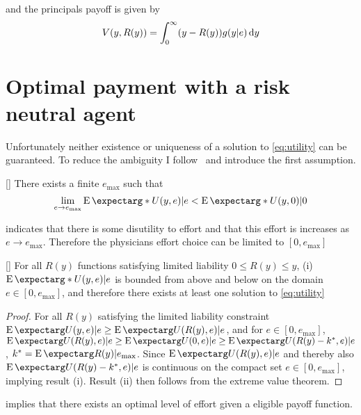 and the principals payoff is given by 
\begin{align}
    V(y,R(y))=\int_0^\infty (y-R(y))g(y|e)\dif y
\end{align}
\section{Optimal payment with a risk neutral agent} %
\label{sec:optimal_payment_with_a_risk_neutral_agent}


Unfortunately neither existence or uniqueness of a solution to \cref{eq:utility} can be guaranteed. To reduce the ambiguity I follow~\textcite{Innes1990Limited} and introduce the first assumption.

\begin{assumption}{[\textcite{Innes1990Limited}]}
\label{asump:effort}
 There exists a finite $e_{\max}$ such that 
\[
    \lim_{e \rightarrow e_{\max}} \cEX*{U(y,e)|e}<\cEX*{U(y,0)|0}
\]
 \end{assumption}

  indicates that there is some disutility to effort and that this effort is increases as $e\rightarrow e_{\max}$. Therefore the physicians effort choice can be limited to $\left[0,e_{\max}\right]$

\begin{lemma}{[\textcite{Innes1990Limited}]}
\label{lem:bounded}
For all $R(y)$ functions satisfying limited liability $0\leq R(y)\leq y$, (i) $\cEX*{U(y,e)|e}$ is bounded from above and below on the domain $e\in\left[0,e_{\max}\right]$, and therefore there exists at least one solution to \cref{eq:utility}
\end{lemma} 

\begin{proof}
For all $R(y)$ satisfying the limited liability constraint $\cEX{U(y,e)|e}\geq\cEX{U(R(y),e)|e}$, and for $e\in\left[0,e_{\max}\right]$, $\cEX{U(R(y),e)|e}\allowbreak\geq\cEX{U(0,e)|e}\allowbreak\geq\cEX{U(R(y)-k^*,e)|e}$, $k^*=\cEX{R(y)|e_{\max}}$. Since $\cEX{U(R(y),e)|e}$ and thereby also $\cEX{U(R(y)-k^*,e)|e}$ is continuous on the compact set $e\in\left[0,e_{\max}\right]$, implying result (i). Result (ii) then follows from the extreme value theorem.
\end{proof}

 implies that there exists an optimal level of effort given a eligible payoff function.

